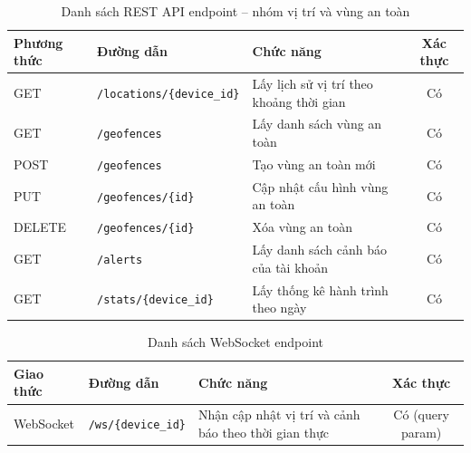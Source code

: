 \documentclass[../DoAn.tex]{subfiles}
\begin{document}
\begin{table}[H]
\centering
\caption{Danh sách REST API endpoint -- nhóm vị trí và vùng an toàn}
\label{table:api_location}
\begin{tabular}{|l|l|p{5.5cm}|c|}
\hline
\textbf{Phương thức} & \textbf{Đường dẫn} & \textbf{Chức năng} & \textbf{Xác thực} \\
\hline
GET    & \texttt{/locations/\{device\_id\}} & Lấy lịch sử vị trí theo khoảng thời gian & Có \\
\hline
GET    & \texttt{/geofences} & Lấy danh sách vùng an toàn & Có \\
\hline
POST   & \texttt{/geofences} & Tạo vùng an toàn mới & Có \\
\hline
PUT    & \texttt{/geofences/\{id\}} & Cập nhật cấu hình vùng an toàn & Có \\
\hline
DELETE & \texttt{/geofences/\{id\}} & Xóa vùng an toàn & Có \\
\hline
GET    & \texttt{/alerts} & Lấy danh sách cảnh báo của tài khoản & Có \\
\hline
GET    & \texttt{/stats/\{device\_id\}} & Lấy thống kê hành trình theo ngày & Có \\
\hline
\end{tabular}
\end{table}

\begin{table}[H]
\centering
\caption{Danh sách WebSocket endpoint}
\label{table:api_ws}
\begin{tabular}{|l|l|p{5.5cm}|c|}
\hline
\textbf{Giao thức} & \textbf{Đường dẫn} & \textbf{Chức năng} & \textbf{Xác thực} \\
\hline
WebSocket & \texttt{/ws/\{device\_id\}} & Nhận cập nhật vị trí và cảnh báo theo thời gian thực & Có (query param) \\
\hline
\end{tabular}
\end{table}
\end{document}
